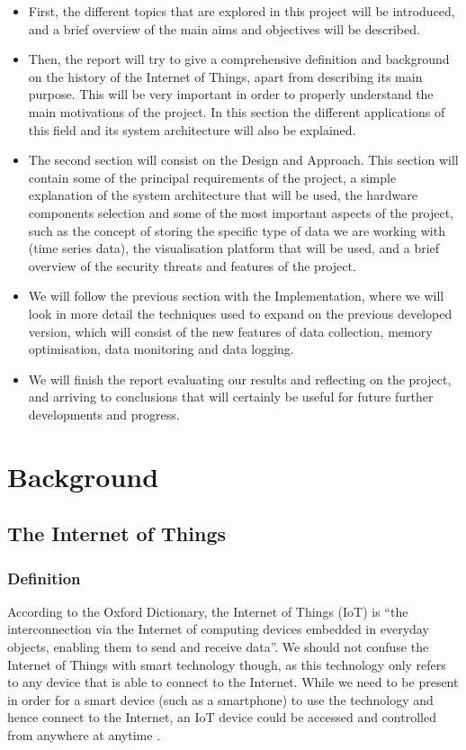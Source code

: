 \documentclass[12pt]{article}
\begin{document}
\begin{itemize}
    \item First, the different topics that are explored in this project will be introduced, and a brief overview of the main aims and objectives will be described.
    \item Then, the report will try to give a comprehensive definition and background on the history of the Internet of Things, apart from describing its main purpose. This will be very important in order to properly understand the main motivations of the project. In this section the different applications of this field and its system architecture will also be explained. 
    \item The second section will consist on the Design and Approach. This section will contain some of the principal requirements of the project, a simple explanation of the system architecture that will be used, the hardware components selection and some of the most important aspects of the project, such as the concept of storing the specific type of data we are working with (time series data), the visualisation platform that will be used, and a brief overview of the security threats and features of the project.
    \item We will follow the previous section with the Implementation, where we will look in more detail the techniques used to expand on the previous developed version, which will consist of the new features of data collection, memory optimisation, data monitoring and data logging.
    \item We will finish the report evaluating our results and reflecting on the project, and arriving to conclusions that will certainly be useful for future further developments and progress. 
\end{itemize}

\section{Background}
\subsection{The Internet of Things}

\subsubsection{Definition}

According to the Oxford Dictionary, the Internet of Things (IoT) is “the interconnection via the Internet of computing devices embedded in everyday objects, enabling them to send and receive data”.  We should not confuse the Internet of Things with smart technology though, as this technology only refers to any device that is able to connect to the Internet. While we need to be present in order for a smart device (such as a smartphone) to use the technology and hence connect to the Internet, an IoT device could be accessed and controlled from anywhere at anytime \cite{french2016digital}.\par
\end{document}
